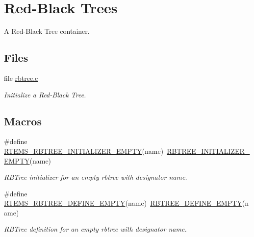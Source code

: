 \hypertarget{group__ClassicRBTrees}{}\section{Red-\/\+Black Trees}
\label{group__ClassicRBTrees}


A Red-\/\+Black Tree container.  


\subsection*{Files}
\begin{DoxyCompactItemize}
\item 
file \mbox{\hyperlink{rbtree_8c}{rbtree.\+c}}
\begin{DoxyCompactList}\small\item\em Initialize a Red-\/\+Black Tree. \end{DoxyCompactList}\end{DoxyCompactItemize}
\subsection*{Macros}
\begin{DoxyCompactItemize}
\item 
\mbox{\label{group__ClassicRBTrees_gabc36965ed217b6e7acc16b024fce3f61}} 
\#define \mbox{\hyperlink{group__ClassicRBTrees_gabc36965ed217b6e7acc16b024fce3f61}{R\+T\+E\+M\+S\+\_\+\+R\+B\+T\+R\+E\+E\+\_\+\+I\+N\+I\+T\+I\+A\+L\+I\+Z\+E\+R\+\_\+\+E\+M\+P\+TY}}(name)~\mbox{\hyperlink{group__RTEMSScoreRBTree_gae75b07f4e75d776a7a1eedde8b22ca85}{R\+B\+T\+R\+E\+E\+\_\+\+I\+N\+I\+T\+I\+A\+L\+I\+Z\+E\+R\+\_\+\+E\+M\+P\+TY}}(name)
\begin{DoxyCompactList}\small\item\em R\+B\+Tree initializer for an empty rbtree with designator {\itshape name}. \end{DoxyCompactList}\item 
\mbox{\label{group__ClassicRBTrees_ga01e3c3f984865b68f17aefa4fad9f38c}} 
\#define \mbox{\hyperlink{group__ClassicRBTrees_ga01e3c3f984865b68f17aefa4fad9f38c}{R\+T\+E\+M\+S\+\_\+\+R\+B\+T\+R\+E\+E\+\_\+\+D\+E\+F\+I\+N\+E\+\_\+\+E\+M\+P\+TY}}(name)~\mbox{\hyperlink{group__RTEMSScoreRBTree_ga87fa6213376a9feed10d3de0a39e61be}{R\+B\+T\+R\+E\+E\+\_\+\+D\+E\+F\+I\+N\+E\+\_\+\+E\+M\+P\+TY}}(name)
\begin{DoxyCompactList}\small\item\em R\+B\+Tree definition for an empty rbtree with designator {\itshape name}. \end{DoxyCompactList}\end{DoxyCompactItemize}
